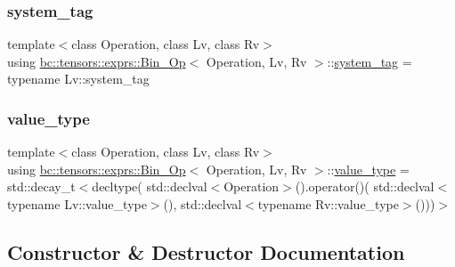 \subsubsection{\texorpdfstring{system\+\_\+tag}{system\_tag}}
{\footnotesize\ttfamily template$<$class Operation, class Lv, class Rv$>$ \\
using \hyperlink{structbc_1_1tensors_1_1exprs_1_1Bin__Op}{bc\+::tensors\+::exprs\+::\+Bin\+\_\+\+Op}$<$ Operation, Lv, Rv $>$\+::\hyperlink{structbc_1_1tensors_1_1exprs_1_1Bin__Op_a5e39aa2bb60266199be2fc701b0edaaf}{system\+\_\+tag} =  typename Lv\+::system\+\_\+tag}

\mbox{\label{structbc_1_1tensors_1_1exprs_1_1Bin__Op_a3928519ff927c73f5dd82ed3d4d00d6c}} 
\subsubsection{\texorpdfstring{value\+\_\+type}{value\_type}}
{\footnotesize\ttfamily template$<$class Operation, class Lv, class Rv$>$ \\
using \hyperlink{structbc_1_1tensors_1_1exprs_1_1Bin__Op}{bc\+::tensors\+::exprs\+::\+Bin\+\_\+\+Op}$<$ Operation, Lv, Rv $>$\+::\hyperlink{structbc_1_1tensors_1_1exprs_1_1Bin__Op_a3928519ff927c73f5dd82ed3d4d00d6c}{value\+\_\+type} =  std\+::decay\+\_\+t$<$decltype( std\+::declval$<$Operation$>$().operator()( std\+::declval$<$typename Lv\+::value\+\_\+type$>$(), std\+::declval$<$typename Rv\+::value\+\_\+type$>$()))$>$}



\subsection{Constructor \& Destructor Documentation}
\mbox{\label{structbc_1_1tensors_1_1exprs_1_1Bin__Op_a573cf3bb0dda167af2e6ca585c584fd9}} 
